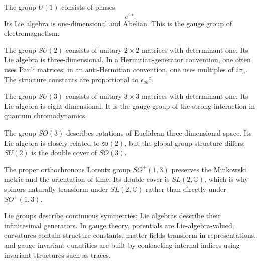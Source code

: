 The group \(U(1)\) consists of phases
\[
    e^{i\alpha}.
\]
Its Lie algebra is one-dimensional and Abelian. This is the gauge group of
electromagnetism.

The group \(SU(2)\) consists of unitary \(2\times2\) matrices with determinant
one. Its Lie algebra is three-dimensional. In a Hermitian-generator convention,
one often uses Pauli matrices; in an anti-Hermitian convention, one uses
multiples of \(i\sigma_a\). The structure constants are proportional to
\(\epsilon_{ab}{}^c\).

The group \(SU(3)\) consists of unitary \(3\times3\) matrices with determinant
one. Its Lie algebra is eight-dimensional. It is the gauge group of the strong
interaction in quantum chromodynamics.

The group \(SO(3)\) describes rotations of Euclidean three-dimensional space.
Its Lie algebra is closely related to \(\mathfrak{su}(2)\), but the global group
structure differs: \(SU(2)\) is the double cover of \(SO(3)\).

The proper orthochronous Lorentz group \(SO^+(1,3)\) preserves the Minkowski
metric and the orientation of time. Its double cover is \(SL(2,\mathbb{C})\),
which is why spinors naturally transform under \(SL(2,\mathbb{C})\) rather than
directly under \(SO^+(1,3)\).

\begin{summarybox}
Lie groups describe continuous symmetries; Lie algebras describe their
infinitesimal generators. In gauge theory, potentials are Lie-algebra-valued,
curvatures contain structure constants, matter fields transform in
representations, and gauge-invariant quantities are built by contracting internal
indices using invariant structures such as traces.
\end{summarybox}
